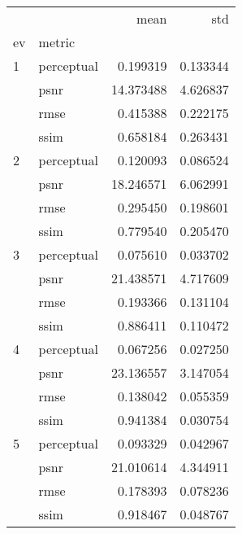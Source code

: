 \begin{tabular}{llrr}
\toprule
  &      &       mean &       std \\
ev & metric &            &           \\
\midrule
1 & perceptual &   0.199319 &  0.133344 \\
  & psnr &  14.373488 &  4.626837 \\
  & rmse &   0.415388 &  0.222175 \\
  & ssim &   0.658184 &  0.263431 \\
2 & perceptual &   0.120093 &  0.086524 \\
  & psnr &  18.246571 &  6.062991 \\
  & rmse &   0.295450 &  0.198601 \\
  & ssim &   0.779540 &  0.205470 \\
3 & perceptual &   0.075610 &  0.033702 \\
  & psnr &  21.438571 &  4.717609 \\
  & rmse &   0.193366 &  0.131104 \\
  & ssim &   0.886411 &  0.110472 \\
4 & perceptual &   0.067256 &  0.027250 \\
  & psnr &  23.136557 &  3.147054 \\
  & rmse &   0.138042 &  0.055359 \\
  & ssim &   0.941384 &  0.030754 \\
5 & perceptual &   0.093329 &  0.042967 \\
  & psnr &  21.010614 &  4.344911 \\
  & rmse &   0.178393 &  0.078236 \\
  & ssim &   0.918467 &  0.048767 \\
\bottomrule
\end{tabular}
